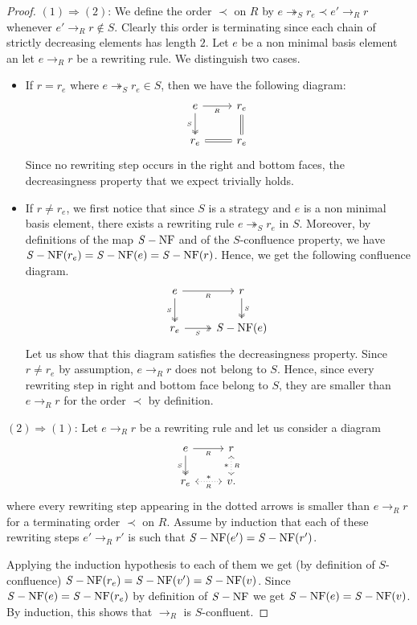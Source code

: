 \documentclass[10pt]{easychair}
\theoremstyle{definition}
\newcommand\rewR{\to_R}
\newcommand\rewS{\twoheadrightarrow_S}
\DeclareMathOperator{\SNF}{{\it S}-NF}
\begin{document}
\begin{proof}
  $(1) \Rightarrow (2)$: We define the order $\prec$ on $R$ by
  $e\rewS r_e\prec e'\rewR r$ whenever $e'\rewR r\notin S$. Clearly this
  order is terminating since each chain of strictly decreasing elements
  has length $2$. Let $e$ be a non minimal basis element an let
  $e\rewR r$ be a rewriting rule. We distinguish two cases.
  \begin{itemize}
  \item If $r=r_e$ where $e\rewS r_e\in S$, then we have the following
    diagram:
    \[\begin{tikzcd}
    e\ar[r, "_R"']\ar[d, twoheadrightarrow, "_S"'] & r_e \ar[equal, d]\\
    r_e\ar[r, equal] & r_e
    \end{tikzcd}\]
    Since no rewriting step occurs in the right and bottom faces, the
    decreasingness property that we expect trivially holds.
  \item If $r\neq r_e$, we first notice that since $S$ is a strategy and
    $e$ is a non minimal  basis element, there exists a rewriting rule
    $e\rewS r_e$ in $S$. Moreover, by definitions of the map $\SNF$ and
    of the $S$-confluence property, we have $\SNF(r_e)=\SNF(e)=\SNF(r)$.
    Hence, we get the following confluence diagram.
    \[\begin{tikzcd}
    e\ar[r, "_R"']\ar[d, twoheadrightarrow, "_S"'] &
    r \ar[twoheadrightarrow, , "_S", d] \\
    r_e\ar[r, twoheadrightarrow, "_S"'] & \SNF (e)
    \end{tikzcd}\]
    Let us show that this diagram satisfies the decreasingness property.
    Since $r\neq r_e$ by assumption, $e\rewR r$ does not belong to $S$.
    Hence, since every rewriting step in right and bottom face belong to
    $S$, they are smaller than $e\rewR r$ for the order $\prec$ by
    definition.
  \end{itemize}
  $(2) \Rightarrow (1)$: Let $e\rewR r$ be a rewriting rule and let us
  consider a diagram
  \[\begin{tikzcd}
  e\ar[r, "_R"']\ar[d, "_S"', twoheadrightarrow] &
  r\ar[d, leftrightarrow, dotted, "*"', "_R"]\\
  r_e\ar[r, leftrightarrow, dotted, "*", "_R"'] & v.
  \end{tikzcd}\]
  where every rewriting step appearing in the dotted arrows is smaller
  than $e\rewR r$ for a terminating order $\prec$ on $R$. Assume by
  induction that each of these rewriting steps $e'\rewR r'$ is such that
  $\SNF(e')=\SNF(r')$.

  
  Applying the induction hypothesis to each of them we get
  (by definition of $S$-confluence) $\SNF(r_e) = \SNF(v') = \SNF(v)$.
  Since $\SNF(e) = \SNF(r_e)$ by definition of $\SNF$ we get
  $\SNF(e) = \SNF(v)$. By induction, this shows that $\rewR$ is
  $S$-confluent.

\end{proof}
\end{document}
